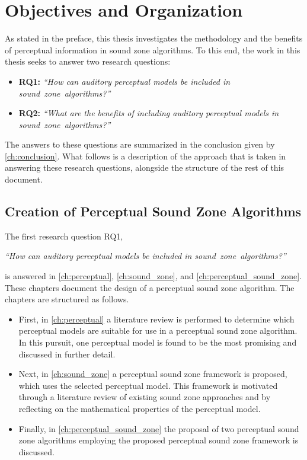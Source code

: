 \section{Objectives and Organization}
\label{ch:introduction:objectives}
As stated in the preface, this thesis investigates the methodology and 
the benefits of perceptual information in sound zone algorithms.
To this end, the work in this thesis seeks to answer two research questions:
\begin{itemize}
    \item \textbf{RQ1:} {\textit{``How can auditory perceptual models be included in sound~zone~algorithms?''}}
    \item \textbf{RQ2:} {\textit{``What are the benefits of including auditory perceptual models in sound~zone~algorithms?''}}
\end{itemize}

The answers to these questions are summarized in the conclusion given by \autoref{ch:conclusion}. 
What follows is a description of the approach that is taken in answering these research questions, 
alongside the structure of the rest of this document.

\subsection{Creation of Perceptual Sound Zone Algorithms}
The first research question RQ1, 

\begin{center}
    {\textit{``How can auditory perceptual models be included in sound~zone~algorithms?''}}
\end{center}

is answered in \autoref{ch:perceptual}, \autoref{ch:sound_zone}, and \autoref{ch:perceptual_sound_zone}.
These chapters document the design of a perceptual sound zone algorithm.
The chapters are structured as follows.
\begin{itemize}
    \item First, in \autoref{ch:perceptual} a literature review is performed to determine which perceptual models are 
        suitable for use in a perceptual sound zone algorithm.
        In this pursuit, one perceptual model is found to be the most promising and discussed in further detail.
    \item Next, in \autoref{ch:sound_zone} a perceptual sound zone framework is proposed, which uses the selected perceptual model.
        This framework is motivated through a literature review of existing sound zone approaches 
        and by reflecting on the mathematical properties of the perceptual model.
    \item Finally, in \autoref{ch:perceptual_sound_zone} the proposal of two perceptual sound zone algorithms 
        employing the proposed perceptual sound zone framework is discussed.
\end{itemize}

